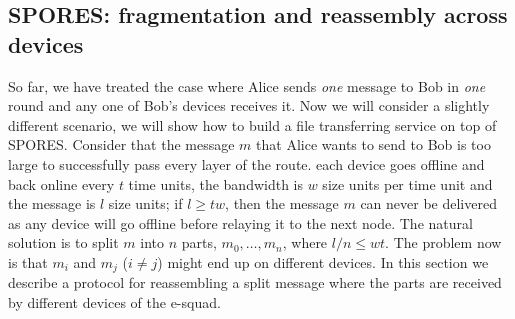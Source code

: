 \subsection{\acs{SPORES}: fragmentation and reassembly across devices}%
\label{SPORES}%
\label{sec:file_exchange}

So far, we have treated the case where Alice sends \emph{one} message to Bob in 
\emph{one} round and any one of Bob's devices receives it.
Now we will consider a slightly different scenario, we will show how to build a 
file transferring service on top of \ac{SPORES}.
Consider that the message \(m\) that Alice wants to send to Bob is too large to 
successfully pass every layer of the route.
\Eg each device goes offline and back online every \(t\) time units, the 
bandwidth is \(w\) size units per time unit and the message is \(l\) size 
units; if \(l\geq t w\), then the message \(m\) can never be delivered as any 
device will go offline before relaying it to the next node.
The natural solution is to split \(m\) into \(n\) parts, \(m_0, \dotsc, m_n\), 
where \(l/n\leq w t\).
The problem now is that \(m_i\) and \(m_j\) (\(i\neq j\)) might end up on 
different devices.
In this section we describe a protocol for reassembling a split message where 
the parts are received by different devices of the e-squad.

